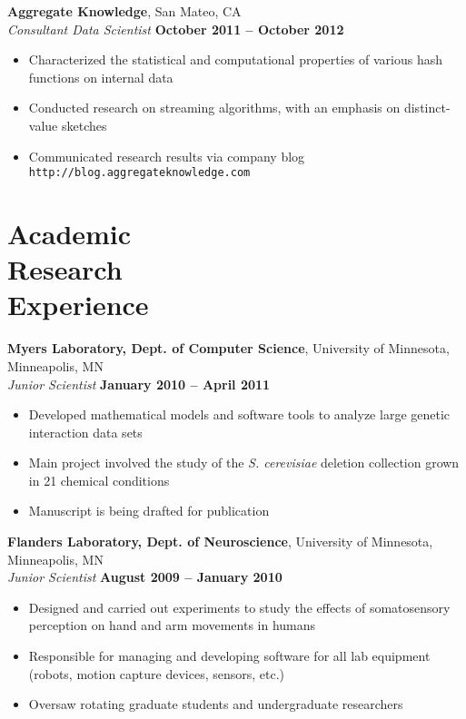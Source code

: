 \documentclass[margin,line]{resume}
\begin{document}
\begin{resume}
    \textbf{Aggregate Knowledge}, San Mateo, CA\\\vspace{1mm}
    \textsl{Consultant Data Scientist} \hfill \textbf{October 2011 -- October 2012}
    \begin{itemize}
    \item Characterized the statistical and computational properties of various hash functions on internal data
    \item Conducted research on streaming algorithms, with an emphasis on distinct-value sketches
    \item Communicated research results via company blog \texttt{http://blog.aggregateknowledge.com}
    \end{itemize}

    \section{\mysidestyle Academic\\Research\\Experience}

    \textbf{Myers Laboratory, Dept. of Computer Science}, University of Minnesota, Minneapolis, MN \\\vspace{1mm}
    \textsl{Junior Scientist} \hfill \textbf{January 2010 -- April 2011}
    \begin{itemize}
    \item Developed mathematical models and software tools to analyze large genetic interaction data sets
    \item Main project involved the study of the \emph{S. cerevisiae} deletion collection grown in 21 chemical conditions
    \item Manuscript is being drafted for publication
    \end{itemize}

    \textbf{Flanders Laboratory, Dept. of Neuroscience}, University of Minnesota, Minneapolis, MN \\\vspace{1mm}
    \textsl{Junior Scientist} \hfill \textbf{August 2009 -- January 2010}
    \begin{itemize}
    \item Designed and carried out experiments to study the effects of somatosensory perception on hand and arm movements in humans
    \item Responsible for managing and developing software for all lab equipment (robots, motion capture devices, sensors, etc.)
    \item Oversaw rotating graduate students and undergraduate researchers
    \end{itemize}


\end{resume}
\end{document}
